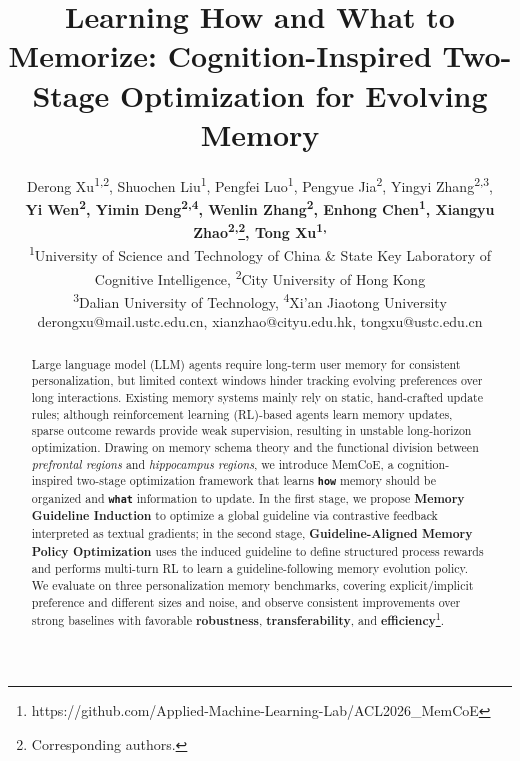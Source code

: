 \documentclass[11pt]{article}
\title{Learning How and What to Memorize: Cognition-Inspired Two-Stage Optimization for Evolving Memory }
\author{Derong Xu\textsuperscript{1,2}, Shuochen Liu\textsuperscript{1}, Pengfei Luo\textsuperscript{1}, Pengyue Jia\textsuperscript{2}, Yingyi Zhang\textsuperscript{2,3},\\ 
{\bf Yi Wen\textsuperscript{2}, Yimin Deng\textsuperscript{2,4}, Wenlin Zhang\textsuperscript{2}, Enhong Chen\textsuperscript{1}, Xiangyu Zhao\textsuperscript{2,}\thanks{Corresponding authors.}, Tong Xu\textsuperscript{1,}\footnotemark[1]}\\
        \textsuperscript{1}University of Science and Technology of China \& State Key Laboratory of\\ Cognitive Intelligence,
        \textsuperscript{2}City University of Hong Kong \\
        \textsuperscript{3}Dalian University of Technology, 
        \textsuperscript{4}Xi'an Jiaotong University \\
derongxu@mail.ustc.edu.cn, xianzhao@cityu.edu.hk, tongxu@ustc.edu.cn
}
\begin{document}
\maketitle
\begin{abstract}
Large language model (LLM) agents require long-term user memory for consistent personalization, but limited context windows hinder tracking evolving preferences over long interactions. Existing memory systems mainly rely on static, hand-crafted update rules; although reinforcement learning (RL)-based agents learn memory updates, sparse outcome rewards provide weak supervision, resulting in unstable long-horizon optimization. Drawing on memory schema theory and the functional division between \emph{prefrontal regions} and \emph{hippocampus regions}, we introduce MemCoE, a cognition-inspired two-stage optimization framework that learns \textbf{\texttt{how}} memory should be organized and \textbf{\texttt{what}} information to update. In the first stage, we propose \textbf{Memory Guideline Induction} to optimize a global guideline via contrastive feedback interpreted as textual gradients; in the second stage, \textbf{Guideline-Aligned Memory Policy Optimization} uses the induced guideline to define structured process rewards and performs multi-turn RL to learn a guideline-following memory evolution policy. We evaluate on three personalization memory benchmarks, covering explicit/implicit preference and different sizes and noise, and observe consistent improvements over strong baselines with favorable \textbf{robustness}, \textbf{transferability}, and \textbf{efficiency}\footnote{https://github.com/Applied-Machine-Learning-Lab/ACL2026\_MemCoE}.

\end{abstract}








%


\newpage
\appendix



\end{document}
